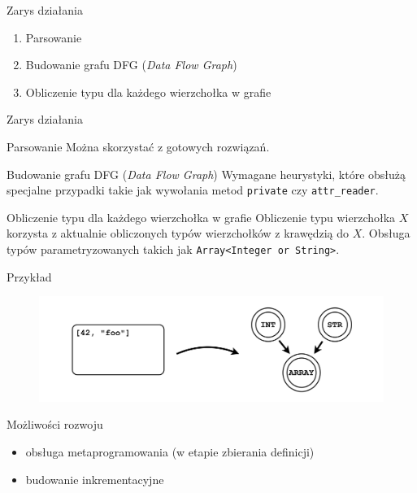 \documentclass{beamer}
\begin{document}
\begin{frame}{Zarys działania}
 \begin{enumerate}
  \item Parsowanie
  \item Budowanie grafu DFG (\textit{Data Flow Graph})
  \item Obliczenie typu dla każdego wierzchołka w grafie
 \end{enumerate}
\end{frame}

\begin{frame}{Zarys działania}
 \begin{block}{Parsowanie}
  Można skorzystać z gotowych rozwiązań.
 \end{block}
 \pause
 \begin{block}{Budowanie grafu DFG (\textit{Data Flow Graph})}
  Wymagane heurystyki, które obsłużą specjalne przypadki takie jak wywołania metod \texttt{private} czy \texttt{attr\_reader}.
 \end{block}
 \pause
 \begin{block}{Obliczenie typu dla każdego wierzchołka w grafie}
  Obliczenie typu wierzchołka $X$ korzysta z aktualnie obliczonych typów wierzchołków z krawędzią do $X$. Obsługa typów parametryzowanych takich jak \texttt{Array<Integer or String>}.
 \end{block}
\end{frame}

\begin{frame}{Przykład}
  \begin{figure}[htb]
    \centering
    \includegraphics[scale=0.6]{msc-array.png}
  \end{figure}
\end{frame}



\begin{frame}{Możliwości rozwoju}
 \begin{itemize}
  \item obsługa metaprogramowania (w etapie zbierania definicji)
  \item budowanie inkrementacyjne
 \end{itemize}
\end{frame}
\end{document}
